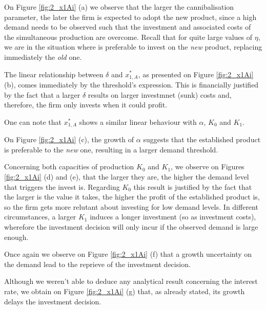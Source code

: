 On Figure \ref{fig:2_x1Ai} (a) we observe that the larger the cannibalisation parameter, the later the firm is expected to adopt the new product, since a high demand needs to be observed such that the investment and associated costs of the simultaneous production are overcome. Recall that for quite large values of $\eta$, we are in the situation where is preferable to invest on the \textit{new} product, replacing immediately the \textit{old} one.

The linear relationship between $\delta$ and $x_{1,A}^*$, as presented on Figure \ref{fig:2_x1Ai} (b), comes immediately  by the threshold's expression. This is financially justified by the fact that a larger $\delta$ results on larger investmnet (sunk) costs and, therefore, the firm only invests when it could profit. 

One can note that $x^*_{1,A}$ shows a similar linear behaviour with $\alpha$, $K_0$ and $K_1$. 

On Figure \ref{fig:2_x1Ai} (c), the growth of $\alpha$ suggests that the established product is preferable to the \textit{new} one, resulting in a larger demand threshold.

Concerning both capacities of production $K_0$ and $K_1$, we observe on Figures \ref{fig:2_x1Ai} (d) and (e), that the larger they are, the higher the demand level that triggers the invest is. Regarding $K_0$ this result is justified by the fact that the larger is the value it takes, the higher the profit of the established product is, so the firm gets more relutant about investing for low demand levels. In different circumstances, a larger $K_1$ induces a longer investment (so as investment costs), wherefore the investment decision will only incur if the observed demand is large enough. 



Once again we observe on Figure \ref{fig:2_x1Ai} (f) that a growth uncertainty on the demand lead to the reprieve of the investment decision. 

Although we weren't able to deduce any analytical result concerning the interest rate, we obtain on Figure \ref{fig:2_x1Ai} (g) that, as already stated, its growth delays the investment decision.


